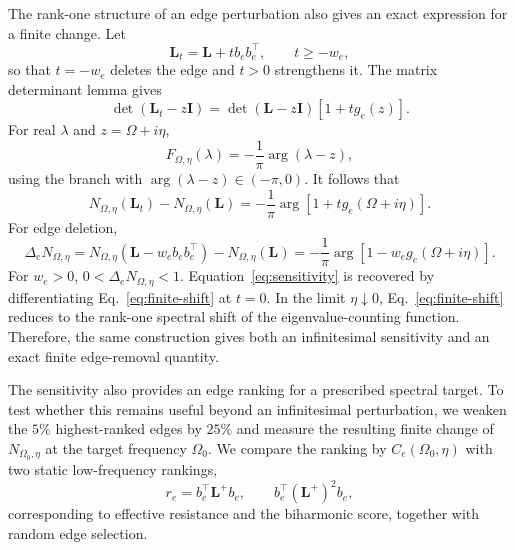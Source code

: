 \documentclass[11pt,reqno]{amsart}
\begin{document}
The rank-one structure of an edge perturbation also gives an exact expression for a finite change. Let
\begin{equation}
\mathbf{L}_t=\mathbf{L}+t b_e b_e^\intercal,
\qquad t\geq-w_e,
\label{eq:rank-one-update}
\end{equation}
so that $t=-w_e$ deletes the edge and $t>0$ strengthens it. The matrix determinant lemma gives
\begin{equation}
\det(\mathbf{L}_t-z\mathbf{I})
=
\det(\mathbf{L}-z\mathbf{I})
\left[1+t g_e(z)\right].
\label{eq:determinant-lemma}
\end{equation}
For real $\lambda$ and $z=\Omega+i\eta$,
\begin{equation}
F_{\Omega,\eta}(\lambda)
=-\frac{1}{\pi}\arg(\lambda-z),
\end{equation}
using the branch with $\arg(\lambda-z)\in(-\pi,0)$. It follows that
\begin{equation}
\boxed{
N_{\Omega,\eta}(\mathbf{L}_t)-N_{\Omega,\eta}(\mathbf{L})
=
-\frac{1}{\pi}
\arg\left[1+t g_e(\Omega+i\eta)\right].
}
\label{eq:finite-shift}
\end{equation}
For edge deletion,
\begin{equation}
\Delta_e N_{\Omega,\eta}
=
N_{\Omega,\eta}(\mathbf{L}-w_e b_e b_e^\intercal)
-N_{\Omega,\eta}(\mathbf{L})
=
-\frac{1}{\pi}
\arg\left[1-w_e g_e(\Omega+i\eta)\right].
\label{eq:deletion-shift}
\end{equation}
For $w_e>0$, $0<\Delta_e N_{\Omega,\eta}<1$. Equation~\eqref{eq:sensitivity} is recovered by differentiating Eq.~\eqref{eq:finite-shift} at $t=0$. In the limit $\eta\downarrow0$, Eq.~\eqref{eq:finite-shift} reduces to the rank-one spectral shift of the eigenvalue-counting function. Therefore, the same construction gives both an infinitesimal sensitivity and an exact finite edge-removal quantity.

The sensitivity also provides an edge ranking for a prescribed spectral target. To test whether this remains useful beyond an infinitesimal perturbation, we weaken the $5\%$ highest-ranked edges by $25\%$ and measure the resulting finite change of $N_{\Omega_0,\eta}$ at the target frequency $\Omega_0$. We compare the ranking by $C_e(\Omega_0,\eta)$ with two static low-frequency rankings,
\begin{equation}
r_e=b_e^\intercal\mathbf{L}^+b_e,
\qquad
b_e^\intercal(\mathbf{L}^+)^2b_e,
\end{equation}
corresponding to effective resistance and the biharmonic score, together with random edge selection.
\end{document}
